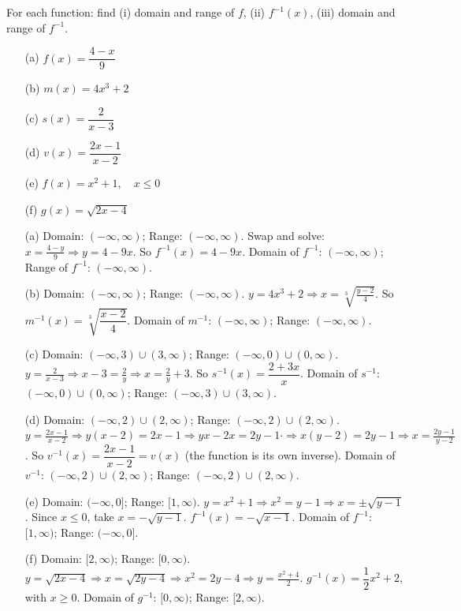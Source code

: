 \documentclass{ximera}
\begin{document}
\begin{problem}
For each function: find (i) domain and range of $f$, (ii) $f^{-1}(x)$, (iii) domain and range of $f^{-1}$.
\begin{enumerate}
  \item[(a)] $f(x) = \dfrac{4-x}{9}$
  \medskip
  \item[(b)] $m(x) = 4x^3+2$
  \medskip
  \item[(c)] $s(x) = \dfrac{2}{x-3}$
  \medskip
  \item[(d)] $v(x) = \dfrac{2x-1}{x-2}$
  \medskip
  \item[(e)] $f(x) = x^2+1,\quad x\leq 0$
  \medskip
  \item[(f)] $g(x) = \sqrt{2x-4}$
\end{enumerate}

\begin{solution}
\begin{enumerate}
  \item[(a)] Domain: $(-\infty,\infty)$; Range: $(-\infty,\infty)$.
  Swap and solve: $x=\tfrac{4-y}{9}\Rightarrow y=4-9x$. So $f^{-1}(x)=4-9x$.
  Domain of $f^{-1}$: $(-\infty,\infty)$; Range of $f^{-1}$: $(-\infty,\infty)$.

  \item[(b)] Domain: $(-\infty,\infty)$; Range: $(-\infty,\infty)$.
  $y=4x^3+2\Rightarrow x=\sqrt[3]{\tfrac{y-2}{4}}$. So $m^{-1}(x)=\sqrt[3]{\dfrac{x-2}{4}}$.
  Domain of $m^{-1}$: $(-\infty,\infty)$; Range: $(-\infty,\infty)$.

  \item[(c)] Domain: $(-\infty,3)\cup(3,\infty)$; Range: $(-\infty,0)\cup(0,\infty)$.
  $y=\tfrac{2}{x-3}\Rightarrow x-3=\tfrac{2}{y}\Rightarrow x=\tfrac{2}{y}+3$. So $s^{-1}(x)=\dfrac{2+3x}{x}$.
  Domain of $s^{-1}$: $(-\infty,0)\cup(0,\infty)$; Range: $(-\infty,3)\cup(3,\infty)$.

  \item[(d)] Domain: $(-\infty,2)\cup(2,\infty)$; Range: $(-\infty,2)\cup(2,\infty)$.
  $y=\tfrac{2x-1}{x-2}\Rightarrow y(x-2)=2x-1\Rightarrow yx-2x=2y-1\cdot\Rightarrow x(y-2)=2y-1\Rightarrow x=\tfrac{2y-1}{y-2}$.
  So $v^{-1}(x)=\dfrac{2x-1}{x-2}=v(x)$ (the function is its own inverse).
  Domain of $v^{-1}$: $(-\infty,2)\cup(2,\infty)$; Range: $(-\infty,2)\cup(2,\infty)$.

  \item[(e)] Domain: $(-\infty,0]$; Range: $[1,\infty)$.
  $y=x^2+1\Rightarrow x^2=y-1\Rightarrow x=\pm\sqrt{y-1}$. Since $x\leq0$, take $x=-\sqrt{y-1}$.
  $f^{-1}(x)=-\sqrt{x-1}$.
  Domain of $f^{-1}$: $[1,\infty)$; Range: $(-\infty,0]$.

  \item[(f)] Domain: $[2,\infty)$; Range: $[0,\infty)$.
  $y=\sqrt{2x-4}\Rightarrow x=\sqrt{2y-4}\Rightarrow x^2=2y-4\Rightarrow y=\tfrac{x^2+4}{2}$.
  $g^{-1}(x)=\dfrac{1}{2}x^2+2$, with $x\geq0$.
  Domain of $g^{-1}$: $[0,\infty)$; Range: $[2,\infty)$.
\end{enumerate}
\end{solution}
\end{problem}
\end{document}
